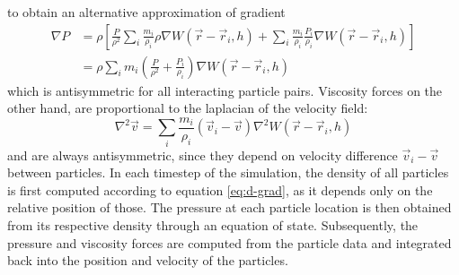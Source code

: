 \documentclass{llncs}
\begin{document}
to obtain an alternative approximation of gradient
\begin{align}
  \label{eq:grad-est}
  \nabla P & = \rho \left[ \frac{P}{\rho^2} \sum_i \frac{m_i}{\rho_i} \rho \nabla
             W(\vec{r}-\vec{r}_i, h)
             +
             \sum_i \frac{m_i}{\rho_i} \frac{P_i}{\rho_i} \nabla W(\vec{r}-\vec{r}_i, h)
             \right] \nonumber \\
           & = \rho \sum_i m_i \left(\frac{P}{\rho^2} + \frac{P_i}{\rho_i} \right)
             \nabla W(\vec{r}-\vec{r}_i, h)
\end{align}
which is antisymmetric for all interacting particle pairs. Viscosity forces on the other
hand, are proportional to the laplacian of the velocity field:
\begin{equation}
  \label{eq:lapl-est}
  \nabla^2\vec{v} = \sum_i \frac{m_i}{\rho_i} (\vec{v}_i - \vec{v}) \nabla^2
  W(\vec{r}-\vec{r}_i, h)
\end{equation}
and are always antisymmetric, since they depend on velocity difference
$\vec{v}_i - \vec{v}$ between particles.  In each timestep of the simulation, the density
of all particles is first computed according to equation \ref{eq:d-grad}, as it depends
only on the relative position of those. The pressure at each particle location is then
obtained from its respective density through an equation of state. Subsequently, the
pressure and viscosity forces are computed from the particle data and integrated back into
the position and velocity of the particles.
\end{document}
